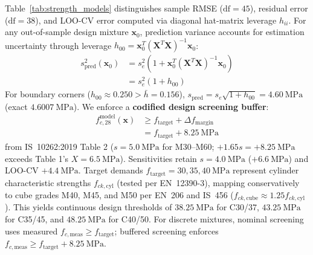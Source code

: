 \documentclass[journal]{IEEEtran}
\begin{document}
Table~\ref{tab:strength_models} distinguishes sample RMSE ($\text{df}=45$), residual error ($\text{df}=38$), and LOO-CV error computed via diagonal hat-matrix leverage $h_{ii}$. For any out-of-sample design mixture $\mathbf{x}_0$, prediction variance accounts for estimation uncertainty through leverage $h_{00} = \mathbf{x}_0^T (\mathbf{X}^T \mathbf{X})^{-1} \mathbf{x}_0$:
\begin{equation}
\begin{aligned}
s_{\mathrm{pred}}^2(\mathbf{x}_0)
&= s_e^2 \left( 1 + \mathbf{x}_0^T (\mathbf{X}^T \mathbf{X})^{-1} \mathbf{x}_0 \right) \\
&= s_e^2 (1 + h_{00})
\end{aligned}
\label{eq:pred_variance}
\end{equation}
For boundary corners ($h_{00} \approx 0.250 > \bar{h} = 0.156$), $s_{\mathrm{pred}} = s_e\sqrt{1 + h_{00}} = 4.60\ \mathrm{MPa}$ (exact $4.6007\ \mathrm{MPa}$). We enforce a \textbf{codified design screening buffer}:
\begin{equation}
\begin{aligned}
f_{c,28}^{\mathrm{model}}(\mathbf{x})
&\ge f_{\mathrm{target}} + \Delta f_{\mathrm{margin}} \\
&= f_{\mathrm{target}} + 8.25\ \mathrm{MPa}
\end{aligned}
\label{eq:strength_buffer}
\end{equation}
from IS~10262:2019 Table 2 ($s=5.0\ \mathrm{MPa}$ for M30--M60; $+1.65 s = +8.25\ \mathrm{MPa}$ exceeds Table 1's $X = 6.5\ \mathrm{MPa}$). Sensitivities retain $s=4.0\ \mathrm{MPa}$ ($+6.6\ \mathrm{MPa}$) and LOO-CV $+4.4\ \mathrm{MPa}$. Target demands $f_{\mathrm{target}} = 30, 35, 40\ \mathrm{MPa}$ represent cylinder characteristic strengths $f_{ck,\mathrm{cyl}}$ (tested per EN~12390-3), mapping conservatively to cube grades M40, M45, and M50 per EN~206 and IS~456 ($f_{ck,\mathrm{cube}} \approx 1.25 f_{ck,\mathrm{cyl}}$). This yields continuous design thresholds of \textbf{$38.25\ \mathrm{MPa}$} for C30/37, \textbf{$43.25\ \mathrm{MPa}$} for C35/45, and \textbf{$48.25\ \mathrm{MPa}$} for C40/50. For discrete mixtures, nominal screening uses measured $f_{c,\mathrm{meas}} \ge f_{\mathrm{target}}$; buffered screening enforces $f_{c,\mathrm{meas}} \ge f_{\mathrm{target}} + 8.25\ \mathrm{MPa}$.
\end{document}
